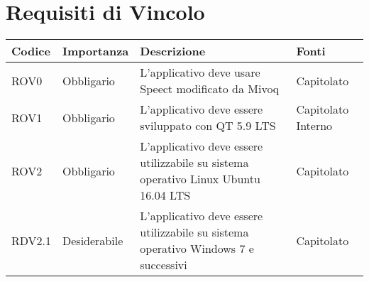 \documentclass[../AnalisideiRequisiti.tex]{subfiles}
\begin{document}
	\section{Requisiti di Vincolo}
			\begin{longtable}{| p{2cm} | p{2.5cm} |p{5cm} | p{2.5cm} |}
			\hline
			\textbf{Codice} & \textbf{Importanza} & \textbf{Descrizione} & \textbf{Fonti}\\
			\hline
			\endhead
				\newline ROV0&\newline Obbligario&
			\newline 
			L'applicativo deve usare Speect modificato da Mivoq &
			\newline Capitolato
			\\[1em]
			\hline	
			\newline 
			ROV1&\newline Obbligario&
			\newline 
			L'applicativo deve essere sviluppato con QT 5.9 LTS &
			\newline Capitolato
			\newline Interno
			\\[1em]
			\hline
			\newline 
			ROV2&\newline Obbligario&
			\newline 
			L'applicativo deve essere utilizzabile su sistema operativo Linux Ubuntu 16.04 LTS&
			\newline Capitolato
			\\[1em]
			\hline
			\newline
			RDV2.1&\newline Desiderabile&
			\newline 
			L'applicativo deve essere utilizzabile su sistema operativo Windows 7 e successivi&
			\newline Capitolato
			\\[1em]
			\hline
	\end{longtable}
\newpage
\end{document}
